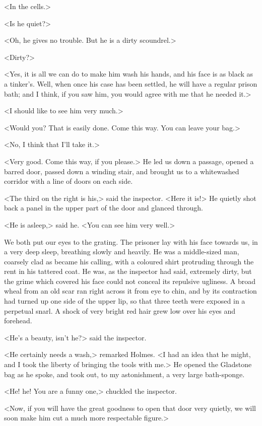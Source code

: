 <In the cells.>

<Is he quiet?>

<Oh, he gives no trouble. But he is a dirty scoundrel.>

<Dirty?>

<Yes, it is all we can do to make him wash his hands, and his face is as black as a tinker's. Well, when once his case has been settled, he will have a regular prison bath; and I think, if you saw him, you would agree with me that he needed it.>

<I should like to see him very much.>

<Would you? That is easily done. Come this way. You can leave your bag.>

<No, I think that I'll take it.>

<Very good. Come this way, if you please.> He led us down a passage, opened a barred door, passed down a winding stair, and brought us to a whitewashed corridor with a line of doors on each side.

<The third on the right is his,> said the inspector. <Here it is!> He quietly shot back a panel in the upper part of the door and glanced through.

<He is asleep,> said he. <You can see him very well.>

We both put our eyes to the grating. The prisoner lay with his face towards us, in a very deep sleep, breathing slowly and heavily. He was a middle-sized man, coarsely clad as became his calling, with a coloured shirt protruding through the rent in his tattered coat. He was, as the inspector had said, extremely dirty, but the grime which covered his face could not conceal its repulsive ugliness. A broad wheal from an old scar ran right across it from eye to chin, and by its contraction had turned up one side of the upper lip, so that three teeth were exposed in a perpetual snarl. A shock of very bright red hair grew low over his eyes and forehead.

<He's a beauty, isn't he?> said the inspector.

<He certainly needs a wash,> remarked Holmes. <I had an idea that he might, and I took the liberty of bringing the tools with me.> He opened the Gladstone bag as he spoke, and took out, to my astonishment, a very large bath-sponge.

<He! he! You are a funny one,> chuckled the inspector.

<Now, if you will have the great goodness to open that door very quietly, we will soon make him cut a much more respectable figure.>

